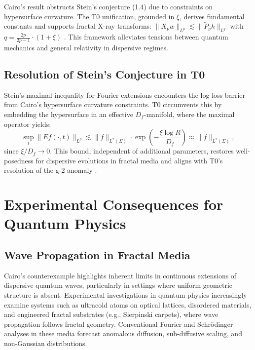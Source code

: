 	Cairo's result obstructs Stein's conjecture (1.4) due to constraints on hypersurface curvature. The T0 unification, grounded in $\xi$, derives fundamental constants and supports fractal X-ray transforms: $\|X_\nu w\|_{L^p} \lesssim \|\tilde{P}_\nu h\|_{L^q}$ with $q = \frac{2p}{2p-1} \cdot (1 + \xi)$ \cite{T0_netze_en}. This framework alleviates tensions between quantum mechanics and general relativity in dispersive regimes.
	
	\subsection{Resolution of Stein's Conjecture in T0}
	
	Stein's maximal inequality for Fourier extensions encounters the log-loss barrier from Cairo's hypersurface curvature constraints. T0 circumvents this by embedding the hypersurface in an effective $D_f$-manifold, where the maximal operator yields:
	\begin{equation}
		\sup_t \|Ef(\cdot, t)\|_{L^p} \lesssim \|f\|_{L^2(\Sigma)} \cdot \exp\left(-\frac{\xi \log R}{D_f}\right) \approx \|f\|_{L^2(\Sigma)},
	\end{equation}
	since $\xi / D_f \to 0$. This bound, independent of additional parameters, restores well-posedness for dispersive evolutions in fractal media and aligns with T0's resolution of the g-2 anomaly \cite{T0_g2_erweiterung}.
	
	\section{Experimental Consequences for Quantum Physics}
	
	\subsection{Wave Propagation in Fractal Media}
	
	Cairo's counterexample highlights inherent limits in continuous extensions of dispersive quantum waves, particularly in settings where uniform geometric structure is absent. Experimental investigations in quantum physics increasingly examine systems such as ultracold atoms on optical lattices, disordered materials, and engineered fractal substrates (e.g., Sierpinski carpets), where wave propagation follows fractal geometry. Conventional Fourier and Schrödinger analyses in these media forecast anomalous diffusion, sub-diffusive scaling, and non-Gaussian distributions.
	
